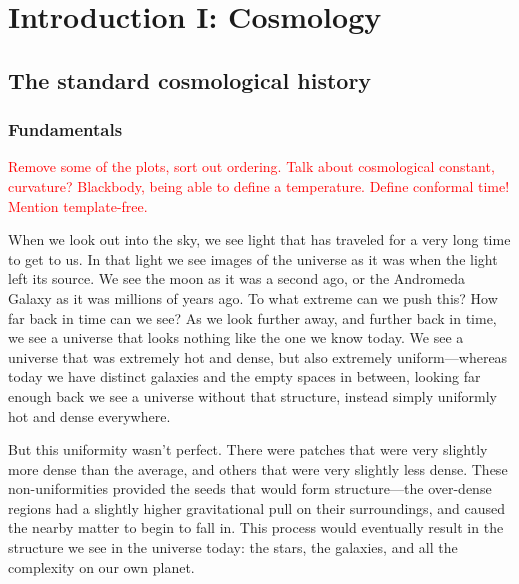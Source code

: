 %
\chapter{Introduction I: Cosmology}\label{chapter:intro_general}
\section{The standard cosmological history}\label{sec:general_intro}
    \subsection{Fundamentals}
\textcolor{red}{Remove some of the plots, sort out ordering. Talk about cosmological constant, curvature?
Blackbody, being able to define a temperature. Define conformal time!
Mention template-free.}


When we look out into the sky, we see light that has traveled for a very long time to get to us.
In that light we see images of the universe as it was when the light left its source.
We see the moon as it was a second ago, or the Andromeda Galaxy as it was millions of
years ago. To what extreme can we push this? How far back in time can we see? As we look further
away, and further back in time, we see a universe that looks nothing like the one we know today.
We see a universe that was extremely hot and dense, but also extremely uniform---whereas today
we have distinct galaxies and the empty spaces in between, looking far enough back we see a universe
without that structure, instead simply uniformly hot and dense everywhere.


But this uniformity wasn't perfect. There were patches that were very slightly more dense than the average,
and others that were very slightly less dense. These non-uniformities provided the seeds that would form
structure---the over-dense regions had a slightly higher gravitational pull on their surroundings,
and caused the nearby matter to begin to fall in. This process would eventually result in the structure
we see in the universe today: the stars, the galaxies, and all the complexity on our own planet.


